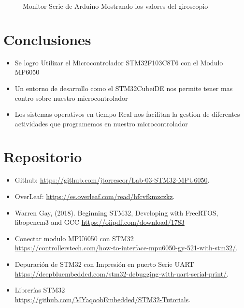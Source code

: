 \documentclass[12pt,oneside,spanish]{article}
\begin{document}
\begin{enumerate}
\begin{figure}[h!]
    \caption{Monitor Serie de Arduino Mostrando los valores del giroscopio}
    \label{fig:my_label}
\end{figure}
\end{enumerate}
\newpage

\section{Conclusiones}
\begin{itemize}
    \item Se logro Utilizar el Microcontrolador STM32F103C8T6 con el Modulo MP6050
    \item Un entorno de desarrollo como el STM32CubeiDE nos permite tener mas contro sobre nuestro microcontrolador
    \item Los sistemas operativos en tiempo Real nos facilitan la gestion de diferentes actividades que programemos en nuestro microcontrolador
\end{itemize}
\section{Repositorio}
\begin{itemize}
    \item Github: 
    \url{https://github.com/jtorrescor/Lab-03-STM32-MPU6050}.
    \item OverLeaf: 
    \url{https://es.overleaf.com/read/hfcvfkmzczkz}.
\end{itemize}

\begin{itemize}
    \item Warren Gay, (2018). Beginning STM32, Developing with FreeRTOS, libopencm3 and GCC \url{https://oiipdf.com/download/1783}
    \item Conectar modulo MPU6050 con STM32\\ 
    \url{https://controllerstech.com/how-to-interface-mpu6050-gy-521-with-stm32/}.
    \item Depuración de STM32 con Impresión en puerto Serie UART\\
    \url{https://deepbluembedded.com/stm32-debugging-with-uart-serial-print/}.
    \item Librerías STM32\\
    \url{https://github.com/MYaqoobEmbedded/STM32-Tutorials}.
\end{itemize}
\appendix

\newpage


\newpage
{} %
\end{document}
